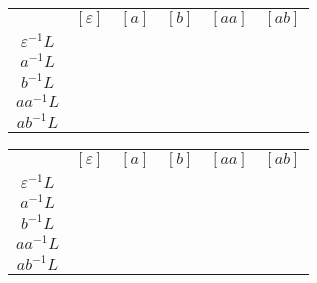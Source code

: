 \newcommand{\grayBox}{\colorbox{gray}{\phantom{x}}\colorbox{gray}{\phantom{x}}\colorbox{gray}{\phantom{x}}}
\newcommand{\redBox}{\colorbox{red}{\phantom{x}}\colorbox{gray}{\phantom{x}}\colorbox{gray}{\phantom{x}}}
\newcommand{\greenBox}{\colorbox{gray}{\phantom{x}}\colorbox{green}{\phantom{x}}\colorbox{gray}{\phantom{x}}}
\newcommand{\blueBox}{\colorbox{gray}{\phantom{x}}\colorbox{gray}{\phantom{x}}\colorbox{blue}{\phantom{x}}}
\newcommand{\rgBox}{\colorbox{red}{\phantom{x}}\colorbox{green}{\phantom{x}}\colorbox{gray}{\phantom{x}}}
\newcommand{\rbBox}{\colorbox{red}{\phantom{x}}\colorbox{gray}{\phantom{x}}\colorbox{blue}{\phantom{x}}}
\newcommand{\bgBox}{\colorbox{gray}{\phantom{x}}\colorbox{green}{\phantom{x}}\colorbox{blue}{\phantom{x}}}

\begin{frame}[fragile]
    \begin{tabular}{ |c||c|c|c|c|c| } 
          \hline
          & $[ε]$ & $[a]$ & $[b]$ & $[aa]$ & $[ab]$ \\
          \hhline{|=#=|=|=|=|=|}
          $ε^{-1}L$ & \grayBox & \grayBox & \grayBox & \grayBox &  \\
          \hline
          $a^{-1}L$ & \grayBox & \grayBox &  & \grayBox & \grayBox \\
          \hline
          $b^{-1}L$ & \grayBox &  & \grayBox & \grayBox &  \\
          \hline
          $aa^{-1}L$ & \grayBox & \grayBox & \grayBox & \grayBox & \grayBox \\
          \hline
          $ab^{-1}L$ &  & \grayBox &  & \grayBox & \grayBox \\
          \hline
      \end{tabular}
  \end{frame}

\begin{frame}[fragile]
  \begin{tabular}{ |c||c|c|c|c|c| } 
		\hline
		& $[ε]$ & $[a]$ & $[b]$ & $[aa]$ & $[ab]$ \\
		\hhline{|=#=|=|=|=|=|}
		$ε^{-1}L$ & \grayBox & \redBox & \grayBox & \grayBox &  \\
		\hline
		$a^{-1}L$ & \grayBox & \grayBox &  & \grayBox & \blueBox \\
		\hline
		$b^{-1}L$ & \grayBox &  & \greenBox & \grayBox &  \\
		\hline
		$aa^{-1}L$ & \grayBox & \grayBox & \grayBox & \grayBox & \grayBox \\
		\hline
		$ab^{-1}L$ &  & \grayBox &  & \grayBox & \grayBox \\
		\hline
	\end{tabular}
\end{frame}


